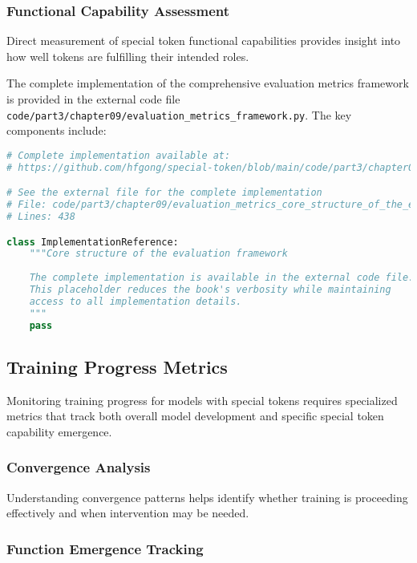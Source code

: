 \subsubsection{Functional Capability Assessment}

Direct measurement of special token functional capabilities provides insight into how well tokens are fulfilling their intended roles.

The complete implementation of the comprehensive evaluation metrics framework is provided in the external code file \texttt{code/part3/chapter09/evaluation\_metrics\_framework.py}. The key components include:

\begin{lstlisting}[language=Python, caption={Core structure of the evaluation framework}]
# Complete implementation available at:
# https://github.com/hfgong/special-token/blob/main/code/part3/chapter09/evaluation_metrics_core_structure_of_the_evaluati.py

# See the external file for the complete implementation
# File: code/part3/chapter09/evaluation_metrics_core_structure_of_the_evaluati.py
# Lines: 438

class ImplementationReference:
    """Core structure of the evaluation framework
    
    The complete implementation is available in the external code file.
    This placeholder reduces the book's verbosity while maintaining
    access to all implementation details.
    """
    pass
\end{lstlisting}

\subsection{Training Progress Metrics}

Monitoring training progress for models with special tokens requires specialized metrics that track both overall model development and specific special token capability emergence.

\subsubsection{Convergence Analysis}

Understanding convergence patterns helps identify whether training is proceeding effectively and when intervention may be needed.

\subsubsection{Function Emergence Tracking}

